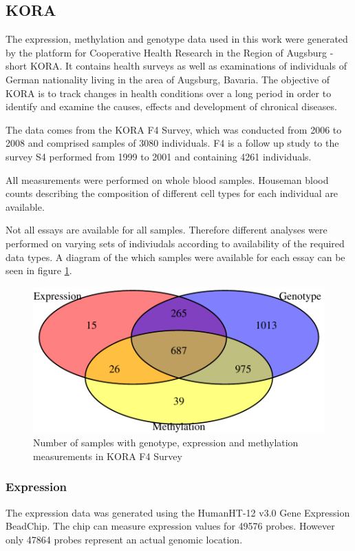 \documentclass[a4paper,12pt]{article}
\begin{document}
\subsection{KORA}
The expression, methylation and genotype data used in this work were generated by the platform for Cooperative Health Research in the Region of Augsburg - short KORA. It contains health surveys as well as examinations of individuals of German nationality living in the area of Augsburg, Bavaria.
The objective of KORA is to track changes in health conditions over a long period in order to identify and examine the causes, effects and development of chronical diseases.

The data comes from the KORA F4 Survey, which was conducted from 2006 to 2008 and comprised samples of 3080 individuals. F4 is a follow up study to the survey S4 performed from 1999 to 2001 and containing 4261 individuals. 

All measurements were performed on whole blood samples. Houseman blood counts\cite{} describing the composition of different cell types for each individual are available.

Not all essays are available for all samples. Therefore different analyses were performed on varying sets of indiviudals according to availability of the required data types. A diagram of the which samples were available for each essay can be seen in figure \ref{fig:samples.venn}.

\begin{figure}[tb]
	\includegraphics[scale = 1, keepaspectratio = true]{../figures/samples_venn}  
	\caption{Number of samples with genotype, expression and methylation measurements in KORA F4 Survey}
    \label{fig:samples.venn}
\end{figure}

\subsubsection{Expression}
The expression data was generated using the HumanHT-12 v3.0 Gene Expression BeadChip. The chip can measure expression values for 49576 probes. However only 47864 probes represent an actual genomic location. 
\end{document}
